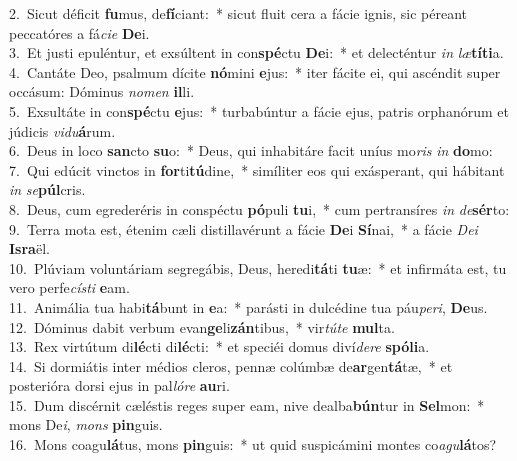 {2.~}Sicut déficit \textbf{fu}mus, de\textbf{fí}ciant:~* sicut fluit cera a fácie ignis, sic péreant peccatóres a fá\textit{ci}\textit{e} \textbf{De}i.\\
{3.~}Et justi epuléntur, et exsúltent in con\textbf{spé}ctu \textbf{De}i:~* et delecténtur \textit{in} \textit{læ}\textbf{tí}\textbf{ti}a.\\
{4.~}Cantáte Deo, psalmum dícite \textbf{nó}mini \textbf{e}jus:~* iter fácite ei, qui ascéndit super occásum: Dóminus \textit{no}\textit{men} \textbf{il}li.\\
{5.~}Exsultáte in con\textbf{spé}ctu \textbf{e}jus:~* turbabúntur a fácie ejus, patris orphanórum et júdicis \textit{vi}\textit{du}\textbf{á}rum.\\
{6.~}Deus in loco \textbf{san}cto \textbf{su}o:~* Deus, qui inhabitáre facit uníus mo\textit{ris} \textit{in} \textbf{do}mo:\\
{7.~}Qui edúcit vinctos in \textbf{for}ti\textbf{tú}dine,~* simíliter eos qui exásperant, qui hábitant \textit{in} \textit{se}\textbf{púl}cris.\\
{8.~}Deus, cum egrederéris in conspéctu \textbf{pó}puli \textbf{tu}i,~* cum pertransíres \textit{in} \textit{de}\textbf{sér}to:\\
{9.~}Terra mota est, étenim cæli distillavérunt a fácie \textbf{De}i \textbf{Sí}nai,~* a fácie \textit{De}\textit{i} \textbf{Is}\textbf{ra}ël.\\
{10.~}Plúviam voluntáriam segregábis, Deus, heredi\textbf{tá}ti \textbf{tu}æ:~* et infirmáta est, tu vero perfe\textit{cí}\textit{sti} \textbf{e}am.\\
{11.~}Animália tua habi\textbf{tá}bunt in \textbf{e}a:~* parásti in dulcédine tua páu\textit{pe}\textit{ri}, \textbf{De}us.\\
{12.~}Dóminus dabit verbum evan\textbf{ge}li\textbf{zán}tibus,~* vir\textit{tú}\textit{te} \textbf{mul}ta.\\
{13.~}Rex virtútum di\textbf{lé}cti di\textbf{lé}cti:~* et speciéi domus diví\textit{de}\textit{re} \textbf{spó}\textbf{li}a.\\
{14.~}Si dormiátis inter médios cleros, pennæ colúmbæ de\textbf{ar}gen\textbf{tá}tæ,~* et posterióra dorsi ejus in pal\textit{ló}\textit{re} \textbf{au}ri.\\
{15.~}Dum discérnit cæléstis reges super eam, nive dealba\textbf{bún}tur in \textbf{Sel}mon:~* mons De\textit{i}, \textit{mons} \textbf{pin}guis.\\
{16.~}Mons coagu\textbf{lá}tus, mons \textbf{pin}guis:~* ut quid suspicámini montes co\textit{a}\textit{gu}\textbf{lá}tos?\\
